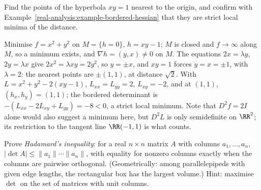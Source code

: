 \begin{exercise}\label{real-analysis:exercise-hyperbola-distance}
Find the points of the hyperbola $xy = 1$ nearest to the origin, and confirm with Example~\ref{real-analysis:example-bordered-hessian} that they are strict local minima of the distance.
\end{exercise}

\begin{solution}
Minimise $f = x^2 + y^2$ on $M = \{h = 0\}$, $h = xy - 1$; $M$ is closed and $f \to \infty$ along $M$, so a minimum exists, and $\nabla h = (y, x) \neq 0$ on $M$. The equations $2x = \lambda y$, $2y = \lambda x$ give
$2x^2 = \lambda xy = 2y^2$, so $y = \pm x$, and $xy = 1$ forces $y = x = \pm1$, with $\lambda = 2$: the nearest points are $\pm(1, 1)$, at distance $\sqrt2$. With $L = x^2 + y^2 - 2(xy - 1)$,
$L_{xx} = L_{yy} = 2$, $L_{xy} = -2$, and at $(1, 1)$, $(h_x, h_y) = (1, 1)$; the bordered determinant is $-(L_{xx} - 2L_{xy} + L_{yy}) = -8 < 0$, a strict local minimum. Note that $D^2f = 2I$ alone would also
suggest a minimum here, but $D^2L$ is only semidefinite on $\RR^2$; its restriction to the tangent line $\RR(-1, 1)$ is what counts.
\end{solution}

\begin{exercise}\label{real-analysis:exercise-hadamard}
Prove \emph{Hadamard's inequality}: for a real $n \times n$ matrix $A$ with columns $a_1, \ldots, a_n$, $|\det A| \leq \|a_1\|\cdots\|a_n\|$, with equality for nonzero columns exactly when the columns are
pairwise orthogonal. (Geometrically: among parallelepipeds with given edge lengths, the rectangular box has the largest volume.) Hint: maximise $\det$ on the set of matrices with unit columns.
\end{exercise}

